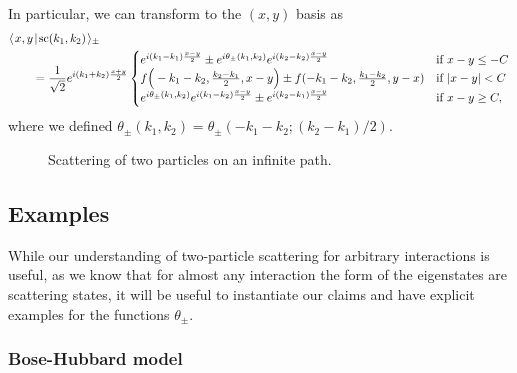 \documentclass[../thesis-main/thesis-main]{subfiles}
\begin{document}
In particular, we can transform  to the $(x,y)$ basis as
\begin{align}
  &\langle\mspace{2mu} x,y \mspace{2mu} | \mspace{2mu} \mathrm{sc}(k_1,k_2)\mspace{2mu} \rangle_{\pm} \nonumber\\
  &\qquad= \frac{1}{\sqrt{2}} e^{i (k_1 + k_2) \frac{x+y}{2}} \begin{cases}  e^{i (k_1 - k_1) \frac{x-y}{2}} \pm e^{i\theta_{\pm}(k_1,k_2)} e^{i (k_2- k_2) \frac{x-y}{2}} &  \text{if }x-y \leq- C\\
  	f\Big(-k_1-k_2,\frac{k_2-k_1}{2},x-y\Big) \pm f(-k_1-k_2,\frac{k_1-k_2}{2},y-x) & \text{if }  |x-y| < C\\
	  e^{i\theta_{\pm}(k_1,k_2)} e^{i (k_1 - k_2) \frac{x-y}{2}}\pm e^{i (k_2- k_1) \frac{x-y}{2}}  &  \text{if }x-y \geq C, \end{cases}
\end{align}
where we defined $\theta_{\pm}(k_1,k_2) = \theta_{\pm}(-k_1-k_2; (k_2-k_1)/2)$.

\begin{figure}
  \centering
  
  \caption{Scattering of two particles on an infinite path.}
  \label{fig:wte}
\end{figure}


\subsection{Examples}

While our understanding of two-particle scattering for arbitrary interactions is useful, as we know that for almost any interaction the form of the eigenstates are scattering states, it will be useful to instantiate our claims and have explicit examples for the functions $\theta_{\pm}$.

\subsubsection{Bose-Hubbard model}
\end{document}
